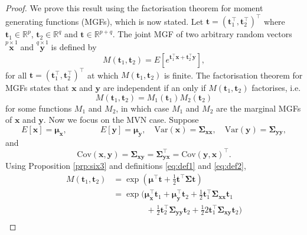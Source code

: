 \documentclass[]{book}
\theoremstyle{definition}
\theoremstyle{definition}
\theoremstyle{definition}
\theoremstyle{remark}
\begin{document}
\begin{proof}
{}We prove this result using the factorisation theorem for moment generating functions (MGFs), which is now stated.
Let \({\mathbf t}=({\mathbf t}_1^\top , {\mathbf t}_2^\top)^\top\) where \({\mathbf t}_1 \in \mathbb{R}^p\), \({\mathbf t}_2 \in \mathbb{R}^q\) and \({\mathbf t} \in \mathbb{R}^{p+q}\). The joint MGF of two arbitrary random vectors \(\stackrel{p \times 1}{\boldsymbol x}\) and \(\stackrel{q \times 1}{\boldsymbol y}\) is defined by
\[
 M({\mathbf t}_1, {\mathbf t}_2)=E[e^{{\mathbf t}_1^\top \boldsymbol x+ {\mathbf t}_2^\top \boldsymbol y}],
  \]
for all \({\mathbf t}=({\mathbf t}_1^\top , {\mathbf t}_2^\top )^\top\) at which \(M({\mathbf t}_1, {\mathbf t}_2)\) is finite.
The factorisation theorem for MGFs states that
\(\boldsymbol x\) and \(\boldsymbol y\) are independent if an only if \(M({\mathbf t}_1 , {\mathbf t}_2)\) factorises, i.e.
\[
M({\mathbf t}_1 , {\mathbf t}_2)=M_1({\mathbf t}_1)M_2({\mathbf t}_2)
\]
for some functions \(M_1\) and \(M_2\), in which case \(M_1\) and \(M_2\) are the marginal MGFs of \(\boldsymbol x\) and \(\boldsymbol y\). Now we focus on the MVN case. Suppose
\begin{equation}
E[\boldsymbol x]=\boldsymbol \mu_{\boldsymbol x}, \qquad \qquad E[\boldsymbol y]=\boldsymbol \mu_{\boldsymbol y}, \quad  \text{Var}(\boldsymbol x)=\boldsymbol \Sigma_{\boldsymbol x\boldsymbol x},
\quad  \text{Var}(\boldsymbol y)=\boldsymbol \Sigma_{\boldsymbol y\boldsymbol y},
\label{eq:def1}
\end{equation}
and
\begin{equation}
\text{Cov}(\boldsymbol x,\boldsymbol y)=\boldsymbol \Sigma_{\boldsymbol x\boldsymbol y}=\boldsymbol \Sigma_{\boldsymbol y\boldsymbol x}^\top = \text{Cov}(\boldsymbol y, \boldsymbol x)^\top.
\label{eq:def2}
\end{equation}
Using Proposition \ref{prp:six3} and definitions \eqref{eq:def1} and \eqref{eq:def2},
\begin{align*}
M({\mathbf t}_1, {\mathbf t}_2)&=\exp\left ( \boldsymbol \mu^\top {\mathbf t} + \frac{1}{2}{\mathbf t}^\top \boldsymbol \Sigma{\mathbf t} \right )\\
&=\exp\bigg (\boldsymbol \mu_{\boldsymbol x}^\top {\mathbf t}_1 +\boldsymbol \mu_{\boldsymbol y}^\top {\mathbf t}_2+\frac{1}{2}{\mathbf t}_1^\top \boldsymbol \Sigma_{\boldsymbol x\boldsymbol x}{\mathbf t_1}\\
& \qquad \qquad +\frac{1}{2}{\mathbf t}_2^\top  \boldsymbol \Sigma_{\boldsymbol y\boldsymbol y}{\mathbf t}_2+\frac{1}{2} 2{\mathbf t}_1^\top \boldsymbol \Sigma_{\boldsymbol x\boldsymbol y}{\mathbf t}_2 \bigg)\\

\end{align*}
\end{proof}
\end{document}
